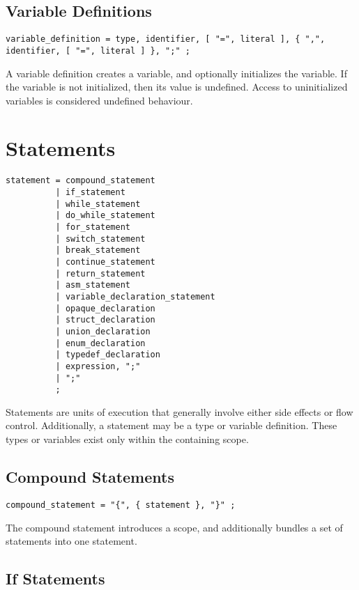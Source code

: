 \documentclass[letterpaper,12pt]{book}
\begin{document}
\section{Variable Definitions}

\begin{lstlisting}[breaklines=true]
variable_definition = type, identifier, [ "=", literal ], { ",", identifier, [ "=", literal ] }, ";" ;
\end{lstlisting}

A variable definition creates a variable, and optionally initializes the variable. If the variable is not initialized, then its value is undefined. Access to uninitialized variables is considered undefined behaviour.

\chapter{Statements}

\begin{lstlisting}[breaklines=true]
statement = compound_statement
          | if_statement
          | while_statement
          | do_while_statement
          | for_statement
          | switch_statement
          | break_statement
          | continue_statement
          | return_statement
          | asm_statement
          | variable_declaration_statement
          | opaque_declaration
          | struct_declaration
          | union_declaration
          | enum_declaration
          | typedef_declaration
          | expression, ";"
          | ";"
          ;
\end{lstlisting}

Statements are units of execution that generally involve either side effects or flow control. Additionally, a statement may be a type or variable definition. These types or variables exist only within the containing scope.

\section{Compound Statements}

\begin{lstlisting}[breaklines=true]
compound_statement = "{", { statement }, "}" ;
\end{lstlisting}

The compound statement introduces a scope, and additionally bundles a set of statements into one statement.

\section{If Statements}
\end{document}
